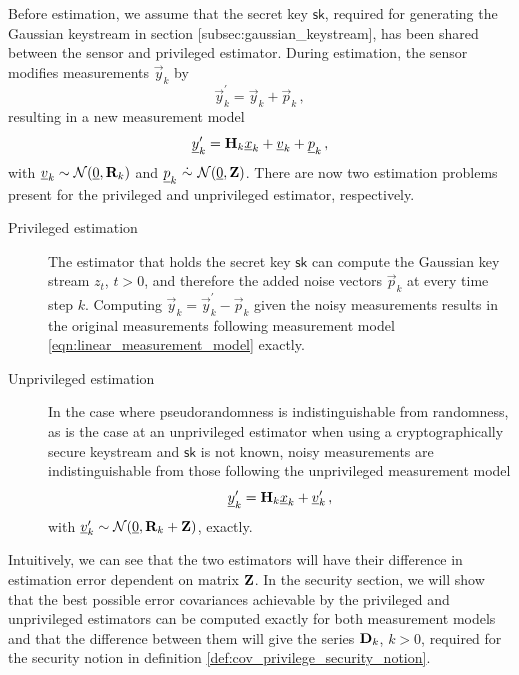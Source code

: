 Before estimation, we assume that the secret key $\mathsf{sk}$, required for generating the Gaussian keystream in section [subsec:gaussian\_keystream], has been shared between the sensor and privileged estimator. During estimation, the sensor modifies measurements $\vec{y}_k$ by
\begin{equation}\label{eqn:modified_measurement_priv}
   \vec{y}^\prime_k = \vec{y}_k + \vec{p}_k\,,
\end{equation}
resulting in a new measurement model
\begin{equation}
   {\underline{y}}^\prime_k = {{\mathbf{H}}}_k{\underline{x}}_k + {\underline{v}}_k + {\underline{p}}_k\,,
\end{equation}
with ${\underline{v}}_k\sim \mathcal{N}({\underline{0}},{{\mathbf{R}}}_k)$ and $\vec{p}_k\ \dot{\sim}\ \mathcal{N}(\vec{0},\mat{Z})$. There are now two estimation problems present for the privileged and unprivileged estimator, respectively.
\begin{description}
   \item[Privileged estimation] The estimator that holds the secret key $\mathsf{sk}$ can compute the Gaussian key stream $z_t$, $t>0$, and therefore the added noise vectors $\vec{p}_k$ at every time step $k$. Computing $\vec{y}_k = \vec{y}^\prime_k - \vec{p}_k$ given the noisy measurements results in the original measurements following measurement model \eqref{eqn:linear_measurement_model} exactly.
   \item[Unprivileged estimation] In the case where pseudorandomness is indistinguishable from randomness, as is the case at an unprivileged estimator when using a cryptographically secure keystream and $\mathsf{sk}$ is not known, noisy measurements are indistinguishable from those following the unprivileged measurement model 
   \begin{equation}\label{eqn:unprivileged_measurement_model}
      {\underline{y}}^\prime_k = {{\mathbf{H}}}_k{\underline{x}}_k + {\underline{v}}^\prime_k\,,
   \end{equation}
   with ${\underline{v}}^\prime_k\sim \mathcal{N}({\underline{0}},{{\mathbf{R}}}_k+{{\mathbf{Z}}})$, exactly.
\end{description}

Intuitively, we can see that the two estimators will have their difference in estimation error dependent on matrix ${{\mathbf{Z}}}$. In the security section, we will show that the best possible error covariances achievable by the privileged and unprivileged estimators can be computed exactly for both measurement models and that the difference between them will give the series ${{\mathbf{D}}}_k$, $k>0$, required for the security notion in definition \ref{def:cov_privilege_security_notion}.

